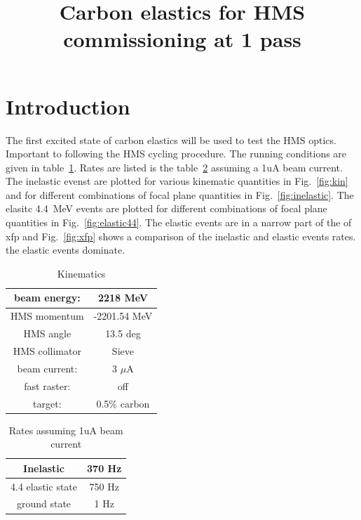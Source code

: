 \documentclass[]{article}
\title{Carbon elastics for HMS commissioning at 1 pass}
\begin{document}
\maketitle


\section{Introduction}

The first excited state of carbon elastics will be used to test the HMS optics.
Important to following the HMS cycling procedure.
The running conditions are given in table~\ref{tab:kin}.
Rates are listed is the table~\ref{tab:rates} assuming a 1uA beam current.
The inelastic evenst are plotted for various kinematic quantities in Fig.~\ref{fig:kin}
and for different combinations of focal plane quantities in Fig.~\ref{fig:inelastic}.
The elasitc 4.4~MeV events are plotted for different combinations
 of focal plane quantities in Fig.~\ref{fig:elastic44}. The elastic events are in a narrow part of the 
 of xfp and Fig.~\ref{fig:xfp} shows a comparison of the inelastic and elastic events rates.
 the elastic events dominate.

\begin{table}[h]
	\begin{center}
		\begin{tabular}[]{|c|c|} \hline\hline
			beam energy: & 2218 MeV\\ \hline
			HMS momentum & -2201.54 MeV \\ \hline
			HMS angle & 13.5 deg \\ \hline
			HMS collimator & Sieve \\ \hline
			beam current: & 3 $\mu$A\\ \hline
			fast raster: & off\\ \hline
			target: & 0.5\% carbon\\ \hline
		\end{tabular}
		\caption{Kinematics}
		\label{tab:kin}
	\end{center}
\end{table}
\begin{table}[h]
	\begin{center}
		\begin{tabular}[]{|c|c|} \hline\hline
			Inelastic & 370 Hz\\ \hline
			4.4 elastic state &  750 Hz\\ \hline
			ground state & 1 Hz \\ \hline
		\end{tabular}
		\caption{Rates assuming 1uA beam current}
\label{tab:rates}
	\end{center}
\end{table}
\end{document}
